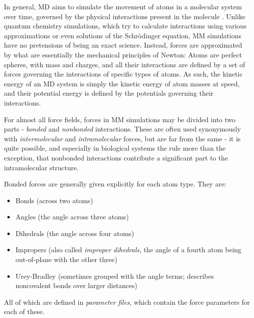 \documentclass[oneside]{scrreprt}
\begin{document}
In general, MD aims to simulate the movement of atoms in a molecular system over time, governed by the physical interactions present in the molecule \cite{Hollingsworth2018Sep}. Unlike quantum chemistry simulations, which try to calculate interactions using various approximations or even solutions of the Schrödinger equation, MM simulations have no pretensions of being an exact science. Instead, forces are approximated by what are essentially the mechanical principles of Newton: Atoms are perfect spheres, with mass and charges, and all their interactions are defined by a set of forces governing the interactions of specific types of atoms. As such, the kinetic energy of an MD system is simply the kinetic energy of atom masses at speed, and their potential energy is defined by the potentials governing their interactions.

For almost all force fields, forces in MM simulations may be divided into two parts - \emph{bonded} and \emph{nonbonded} interactions. These are often used synonymously with \emph{intermolecular} and \emph{intramolecular} forces, but are far from the same - it is quite possible, and especially in biological systems the rule more than the exception, that nonbonded interactions contribute a significant part to the intramolecular structure.

Bonded forces are generally given explicitly for each atom type. They are:
\begin{itemize}
    \item Bonds (across two atoms)
    \item Angles (the angle across three atoms)
    \item Dihedrals (the angle across four atoms)
    \item Impropers (also called \emph{improper dihedrals}, the angle of a fourth atom being out-of-plane with the other three)
    \item Urey-Bradley (sometimes grouped with the angle terms; describes noncovalent bonds over larger distances)
\end{itemize}

All of which are defined in \emph{parameter files}, which contain the force parameters for each of these.
\end{document}

